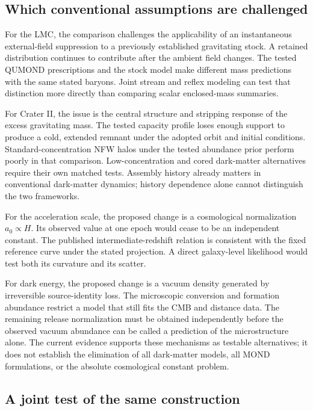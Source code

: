 \subsection{Which conventional assumptions are challenged}

For the LMC, the comparison challenges the applicability of an
instantaneous external-field suppression to a previously established
gravitating stock. A retained distribution continues to contribute after
the ambient field changes. The tested QUMOND prescriptions and the stock
model make different mass predictions with the same stated baryons.
Joint stream and reflex modeling can test that distinction more directly
than comparing scalar enclosed-mass summaries.

For Crater II, the issue is the central structure and stripping response
of the excess gravitating mass. The tested capacity profile loses enough
support to produce a cold, extended remnant under the adopted orbit and
initial conditions. Standard-concentration NFW halos under the tested
abundance prior perform poorly in that comparison. Low-concentration
and cored dark-matter alternatives require their own matched tests.
Assembly history already matters in conventional dark-matter dynamics;
history dependence alone cannot distinguish the two frameworks.

For the acceleration scale, the proposed change is a cosmological
normalization $a_0\propto H$. Its observed value at one epoch would cease
to be an independent constant. The published intermediate-redshift
relation is consistent with the fixed reference curve under the stated
projection. A direct galaxy-level likelihood would test both its curvature
and its scatter.

For dark energy, the proposed change is a vacuum density generated by
irreversible source-identity loss. The microscopic conversion and
formation abundance restrict a model that still fits the CMB and distance
data. The remaining release normalization must be obtained independently
before the observed vacuum abundance can be called a prediction of the
microstructure alone. The current evidence supports these mechanisms as
testable alternatives; it does not establish the elimination of all
dark-matter models, all MOND formulations, or the absolute cosmological
constant problem.

\subsection{A joint test of the same construction}
\label{sec:jointtest}

